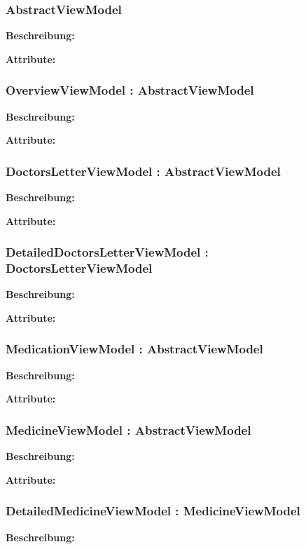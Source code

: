 \documentclass[a4paper]{scrreprt}
\begin{document}
\subsubsection{AbstractViewModel}
\textbf{Beschreibung:}

\textbf{Attribute:}\\

\subsubsection{OverviewViewModel : AbstractViewModel}
\textbf{Beschreibung:}

\textbf{Attribute:}\\

\subsubsection{DoctorsLetterViewModel : AbstractViewModel}
\textbf{Beschreibung:}

\textbf{Attribute:}\\

\subsubsection{DetailedDoctorsLetterViewModel : DoctorsLetterViewModel}
\textbf{Beschreibung:}

\textbf{Attribute:}\\

\subsubsection{MedicationViewModel : AbstractViewModel}
\textbf{Beschreibung:}

\textbf{Attribute:}\\

\subsubsection{MedicineViewModel : AbstractViewModel}
\textbf{Beschreibung:}

\textbf{Attribute:}\\

\subsubsection{DetailedMedicineViewModel : MedicineViewModel}
\textbf{Beschreibung:}
\end{document}
